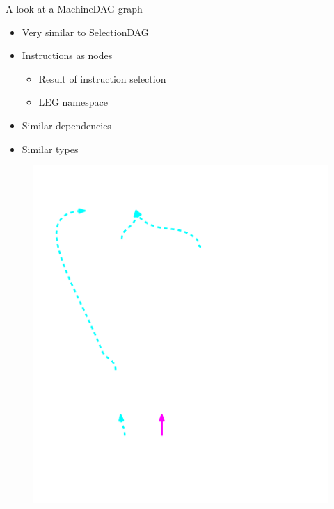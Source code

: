 
\begin{frame}{A look at a MachineDAG graph}

\begin{minipage}[t]{0.50\linewidth}
    \begin{itemize}
        \item Very similar to SelectionDAG
        \item Instructions as nodes
        \begin{itemize}
            \item Result of instruction selection
            \item LEG namespace
        \end{itemize}
        \item Similar dependencies
        \item Similar types
    \end{itemize}
\end{minipage}
\begin{minipage}[t]{0.49\linewidth}
    \begin{figure}
        \vspace{-2.2ex}
        \includegraphics[width = 1.00\textwidth]{examples/ex1b/ex1b-post-isel.pdf}
    \end{figure}
\end{minipage}


\end{frame}

